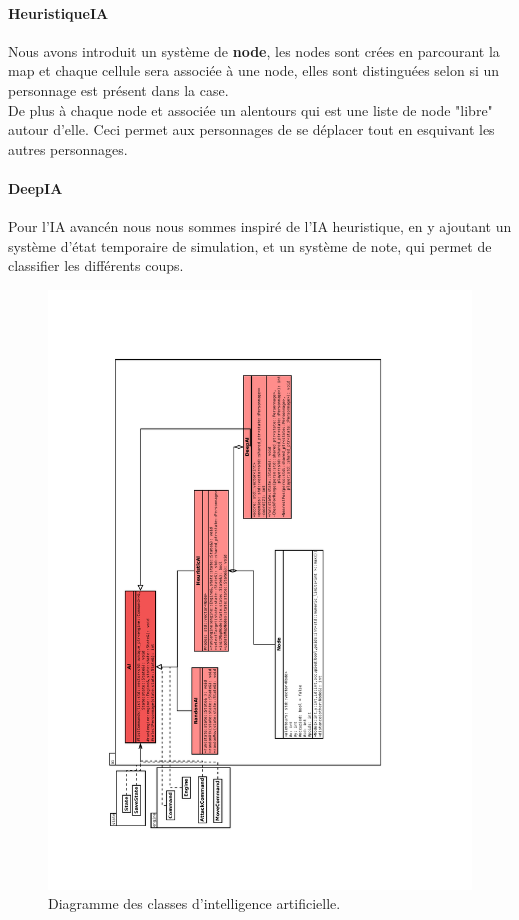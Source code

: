 \documentclass[a4paper,12pt]{article}
\begin{document}
\paragraph{HeuristiqueIA}
Nous avons introduit un système de \textbf{node}, les nodes sont crées en parcourant la map et chaque cellule sera associée à une node, elles sont distinguées selon si un personnage est présent dans la case.\\
De plus à chaque node et associée un alentours qui est une liste de node "libre" autour d'elle. Ceci permet aux personnages de se déplacer tout en esquivant les autres personnages. 
\paragraph{DeepIA}
Pour l'IA avancén nous nous sommes inspiré de l'IA heuristique, en y ajoutant un système d'état temporaire
de simulation, et un système de note, qui permet de classifier les différents coups.
\begin{landscape}
\begin{figure}[p]
\includegraphics[width=0.6\paperheight,angle=270]{ai.pdf}
\caption{\label{uml:ai}Diagramme des classes d'intelligence artificielle.} 
\end{figure}
\end{landscape}
\end{document}
